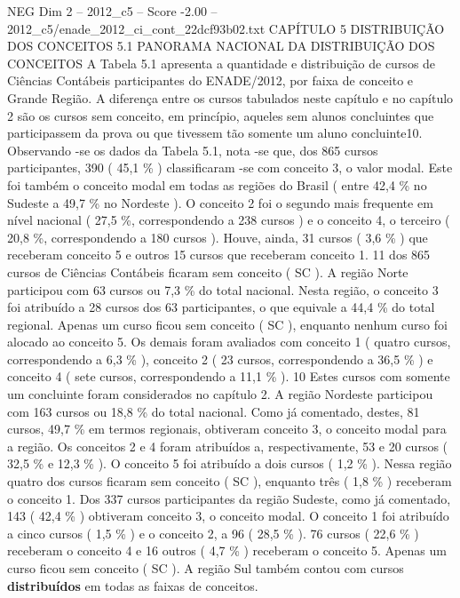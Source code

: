 \begin{textsample}{NEG Dim 2 – 2012\_c5 – Score -2.00 – 2012\_c5/enade\_2012\_ci\_cont\_22dcf93b02.txt}  \label{ex:f2_neg_071}
CAPÍTULO 5 DISTRIBUIÇÃO DOS CONCEITOS 5.1 PANORAMA NACIONAL DA DISTRIBUIÇÃO DOS CONCEITOS A Tabela 5.1 apresenta a quantidade e distribuição de cursos de Ciências Contábeis participantes do ENADE/2012, por faixa de conceito e Grande Região.
A diferença entre os cursos tabulados neste capítulo e no capítulo 2 são os cursos sem conceito, em princípio, aqueles sem alunos concluintes que participassem da prova ou que tivessem tão somente um aluno concluinte10.
Observando -se os dados da Tabela 5.1, nota -se que, dos 865 cursos participantes, 390 ( 45,1 \% ) classificaram -se com conceito 3, o valor modal.
Este foi também o conceito modal em todas as regiões do Brasil ( entre 42,4 \% no Sudeste a 49,7 \% no Nordeste ).
O conceito 2 foi o segundo mais frequente em nível nacional ( 27,5 \%, correspondendo a 238 cursos ) e o conceito 4, o terceiro ( 20,8 \%, correspondendo a 180 cursos ).
Houve, ainda, 31 cursos ( 3,6 \% ) que receberam conceito 5 e outros 15 cursos que receberam conceito 1. 11 dos 865 cursos de Ciências Contábeis ficaram sem conceito ( SC ).
A região Norte participou com 63 cursos ou 7,3 \% do total nacional.
Nesta região, o conceito 3 foi atribuído a 28 cursos dos 63 participantes, o que equivale a 44,4 \% do total regional.
Apenas um curso ficou sem conceito ( SC ), enquanto nenhum curso foi alocado ao conceito 5.
Os demais foram avaliados com conceito 1 ( quatro cursos, correspondendo a 6,3 \% ), conceito 2 ( 23 cursos, correspondendo a 36,5 \% ) e conceito 4 ( sete cursos, correspondendo a 11,1 \% ). 10 Estes cursos com somente um concluinte foram considerados no capítulo 2.
A região Nordeste participou com 163 cursos ou 18,8 \% do total nacional.
Como já comentado, destes, 81 cursos, 49,7 \% em termos regionais, obtiveram conceito 3, o conceito modal para a região.
Os conceitos 2 e 4 foram atribuídos a, respectivamente, 53 e 20 cursos ( 32,5 \% e 12,3 \% ).
O conceito 5 foi atribuído a dois cursos ( 1,2 \% ).
Nessa região quatro dos cursos ficaram sem conceito ( SC ), enquanto três ( 1,8 \% ) receberam o conceito 1.
Dos 337 cursos participantes da região Sudeste, como já comentado, 143 ( 42,4 \% ) obtiveram conceito 3, o conceito modal.
O conceito 1 foi atribuído a cinco cursos ( 1,5 \% ) e o conceito 2, a 96 ( 28,5 \% ). 76 cursos ( 22,6 \% ) receberam o conceito 4 e 16 outros ( 4,7 \% ) receberam o conceito 5.
Apenas um curso ficou sem conceito ( SC ).
A região Sul também contou com cursos \textbf{distribuídos} em todas as faixas de conceitos.

\end{textsample}

